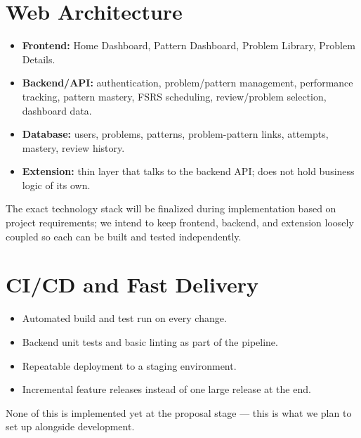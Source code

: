 \documentclass[11pt,a4paper]{article}
\begin{document}
\section{Web Architecture}
\begin{center}
\end{center}
\begin{itemize}[leftmargin=0.7cm]
\item \textbf{Frontend:} Home Dashboard, Pattern Dashboard, Problem Library, Problem Details.
\item \textbf{Backend/API:} authentication, problem/pattern management, performance tracking, pattern mastery, FSRS scheduling, review/problem selection, dashboard data.
\item \textbf{Database:} users, problems, patterns, problem-pattern links, attempts, mastery, review history.
\item \textbf{Extension:} thin layer that talks to the backend API; does not hold business logic of its own.
\end{itemize}
The exact technology stack will be finalized during implementation based on project requirements; we intend to keep frontend, backend, and extension loosely coupled so each can be built and tested independently.

\section{CI/CD and Fast Delivery}
\begin{itemize}[leftmargin=0.7cm]
\item Automated build and test run on every change.
\item Backend unit tests and basic linting as part of the pipeline.
\item Repeatable deployment to a staging environment.
\item Incremental feature releases instead of one large release at the end.
\end{itemize}
None of this is implemented yet at the proposal stage --- this is what we plan to set up alongside development.
\end{document}
